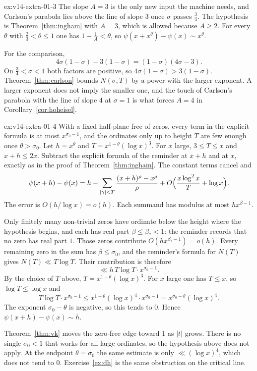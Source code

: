 \begin{solution}{ex:v14-extra-01-3}
\idea The slope $A=3$ is the only new input the machine needs, and Carlson's parabola lies above the line of slope $3$ once $\sigma$ passes $\frac34$.
\writeup The hypothesis is Theorem~\ref{thm:ingham} with $A=3$, which is allowed because $A\ge2$. For every $\theta$ with $\frac23<\theta\le1$ one has $1-\frac1A<\theta$, so $\psi(x+x^\theta)-\psi(x)\sim x^\theta$.

For the comparison,
\[
4\sigma(1-\sigma)-3(1-\sigma)=(1-\sigma)(4\sigma-3).
\]
On $\frac34<\sigma<1$ both factors are positive, so $4\sigma(1-\sigma)>3(1-\sigma)$. Theorem~\ref{thm:carlson} bounds $N(\sigma,T)$ by a power with the larger exponent. A larger exponent does not imply the smaller one, and the touch of Carlson's parabola with the line of slope $4$ at $\sigma=1$ is what forces $A=4$ in Corollary~\ref{cor:hoheisel}.
\end{solution}

\begin{solution}{ex:v14-extra-01-4}
\idea With a fixed half-plane free of zeros, every term in the explicit formula is at most $x^{\sigma_0-1}$, and the ordinates only up to height $T$ are few enough once $\theta>\sigma_0$.
\writeup Let $h=x^\theta$ and $T=x^{1-\theta}(\log x)^3$. For $x$ large, $3\le T\le x$ and $x+h\le2x$. Subtract the explicit formula of the reminder at $x+h$ and at $x$, exactly as in the proof of Theorem~\ref{thm:ingham}. The constant terms cancel and
\[
\psi(x+h)-\psi(x)=h-\sum_{|\gamma|<T}\frac{(x+h)^\rho-x^\rho}\rho+O\Bigl(\frac{x\log^2x}T+\log x\Bigr).
\]
The error is $O(h/\log x)=o(h)$. Each summand has modulus at most $hx^{\beta-1}$.

Only finitely many non-trivial zeros have ordinate below the height where the hypothesis begins, and each has real part $\beta\le\beta_*<1$: the reminder records that no zero has real part $1$. Those zeros contribute $O(hx^{\beta_*-1})=o(h)$. Every remaining zero in the sum has $\beta\le\sigma_0$, and the reminder's formula for $N(T)$ gives $N(T)\ll T\log T$. Their contribution is therefore
\[
\ll h\,T\log T\cdot x^{\sigma_0-1}.
\]
By the choice of $T$ above, $T=x^{1-\theta}(\log x)^3$. For $x$ large one has $T\le x$, so $\log T\le\log x$ and
\[
T\log T\cdot x^{\sigma_0-1}\le x^{1-\theta}(\log x)^4\cdot x^{\sigma_0-1}=x^{\sigma_0-\theta}(\log x)^4.
\]
The exponent $\sigma_0-\theta$ is negative, so this tends to $0$. Hence $\psi(x+h)-\psi(x)\sim h$.

Theorem~\ref{thm:vk} moves the zero-free edge toward $1$ as $|t|$ grows. There is no single $\sigma_0<1$ that works for all large ordinates, so the hypothesis above does not apply. At the endpoint $\theta=\sigma_0$ the same estimate is only $\ll(\log x)^4$, which does not tend to $0$. Exercise~\ref{ex:dh} is the same obstruction on the critical line.
\end{solution}

